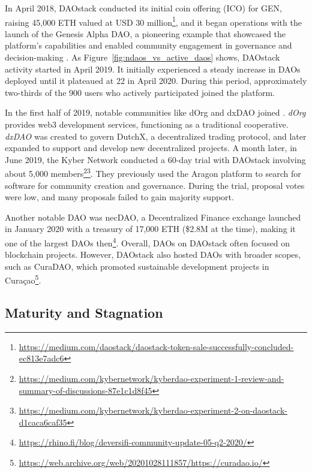 \documentclass[10pt,lineno]{wlpeerj}
\begin{document}
In April 2018, DAOstack conducted its initial coin offering (ICO) for GEN, raising 45,000 ETH valued at USD 30 million\footnote{\url{https://medium.com/daostack/daostack-token-sale-successfully-concluded-ec813e7adc6}}, and it began operations with the launch of the Genesis Alpha DAO, a pioneering example that showcased the platform’s capabilities and enabled community engagement in governance and decision-making \citep{cryptocommons_genesis_2019}.
As Figure~\ref{fig:ndaos_vs_active_daos} shows, DAOstack activity started in April 2019. It initially experienced a steady increase in DAOs deployed until it plateaued at 22 in April 2020. During this period, approximately two-thirds of the 900 users who actively participated joined the platform.





In the first half of 2019, notable communities like dOrg and dxDAO joined \citep{Arroyo2022}. \emph{dOrg} provides web3 development services, functioning as a traditional cooperative. \emph{dxDAO} was created to govern DutchX, a decentralized trading protocol, and later expanded to support and develop new decentralized projects.
A month later, in June 2019, the Kyber Network conducted a 60-day trial with DAOstack involving about 5,000 members\footnote{\url{https://medium.com/kybernetwork/kyberdao-experiment-1-review-and-summary-of-discussions-87e1c1d8f45}}\footnote{\url{https://medium.com/kybernetwork/kyberdao-experiment-2-on-daostack-d1caca6caf35}}. %
They previously used the Aragon platform to search for software for community creation and governance. During the trial, proposal votes were low, and many proposals failed to gain majority support.


Another notable DAO was necDAO, a Decentralized Finance exchange launched in January 2020 with a treasury of 17,000 ETH (\$2.8M at the time), making it one of the largest DAOs then\footnote{\url{https://rhino.fi/blog/deversifi-community-update-05-q2-2020/}}. %
Overall, DAOs on DAOstack often focused on blockchain projects. However, DAOstack also hosted DAOs with broader scopes, such as CuraDAO, which promoted sustainable development projects in Curaçao\footnote{\url{https://web.archive.org/web/20201028111857/https://curadao.io/}}. %

\subsection{Maturity and Stagnation}
\end{document}
